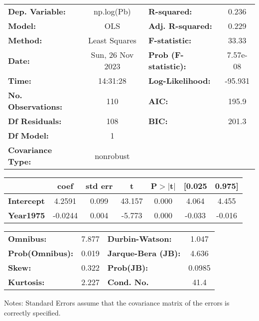 \begin{center}
\begin{tabular}{lclc}
\toprule
\textbf{Dep. Variable:}    &    np.log(Pb)    & \textbf{  R-squared:         } &     0.236   \\
\textbf{Model:}            &       OLS        & \textbf{  Adj. R-squared:    } &     0.229   \\
\textbf{Method:}           &  Least Squares   & \textbf{  F-statistic:       } &     33.33   \\
\textbf{Date:}             & Sun, 26 Nov 2023 & \textbf{  Prob (F-statistic):} &  7.57e-08   \\
\textbf{Time:}             &     14:31:28     & \textbf{  Log-Likelihood:    } &   -95.931   \\
\textbf{No. Observations:} &         110      & \textbf{  AIC:               } &     195.9   \\
\textbf{Df Residuals:}     &         108      & \textbf{  BIC:               } &     201.3   \\
\textbf{Df Model:}         &           1      & \textbf{                     } &             \\
\textbf{Covariance Type:}  &    nonrobust     & \textbf{                     } &             \\
\bottomrule
\end{tabular}
\begin{tabular}{lcccccc}
                   & \textbf{coef} & \textbf{std err} & \textbf{t} & \textbf{P$> |$t$|$} & \textbf{[0.025} & \textbf{0.975]}  \\
\midrule
\textbf{Intercept} &       4.2591  &        0.099     &    43.157  &         0.000        &        4.064    &        4.455     \\
\textbf{Year1975}  &      -0.0244  &        0.004     &    -5.773  &         0.000        &       -0.033    &       -0.016     \\
\bottomrule
\end{tabular}
\begin{tabular}{lclc}
\textbf{Omnibus:}       &  7.877 & \textbf{  Durbin-Watson:     } &    1.047  \\
\textbf{Prob(Omnibus):} &  0.019 & \textbf{  Jarque-Bera (JB):  } &    4.636  \\
\textbf{Skew:}          &  0.322 & \textbf{  Prob(JB):          } &   0.0985  \\
\textbf{Kurtosis:}      &  2.227 & \textbf{  Cond. No.          } &     41.4  \\
\bottomrule
\end{tabular}
\end{center}

Notes: \newline
 [1] Standard Errors assume that the covariance matrix of the errors is correctly specified.